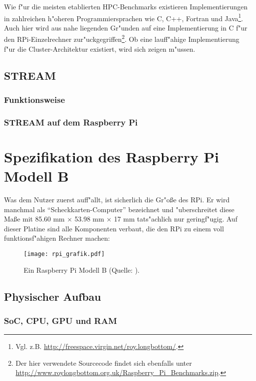 Wie f"ur die meisten etablierten HPC-Benchmarks existieren Implementierungen in zahlreichen h"oheren Programmiersprachen wie C, C++, Fortran und Java\footnote{Vgl. z.B. \url{http://freespace.virgin.net/roy.longbottom/}.}. Auch hier wird aus nahe liegenden Gr"unden auf eine Implementierung in C f"ur den RPi-Einzelrechner zur"uckgegriffen\footnote{Der hier verwendete Sourcecode findet sich ebenfalls unter \url{http://www.roylongbottom.org.uk/Raspberry_Pi_Benchmarks.zip}.}. Ob eine lauff"ahige Implementierung f"ur die Cluster-Architektur existiert, wird sich zeigen m"ussen. 
\subsection{STREAM}\label{STREAM}
\subsubsection{Funktionsweise}\label{Funktionsweise STREAM}
\subsubsection{STREAM auf dem Raspberry Pi}\label{STREAM RPi}
\section{Spezifikation des Raspberry Pi Modell B}\label{RPi Spezifikation}

Was dem Nutzer zuerst auff"allt, ist sicherlich die Gr"o\ss e des RPi. Er wird manchmal als "`Scheckkarten-Computer"' bezeichnet und "uberschreitet diese Ma\ss e mit 85.60 mm $\times$ 53.98 mm $\times$ 17 mm tats"achlich nur geringf"ugig. Auf dieser Platine sind alle Komponenten verbaut, die den RPi zu einem voll funktionsf"ahigen Rechner machen:
\begin{figure}[htb]
	\centering
	\texttt{[image: rpi\_grafik.pdf]}\\ 
	\caption{Ein Raspberry Pi Modell B (Quelle: \cite{scrguide01}).}\label{fig:RPi-Spezifikation}
\end{figure}

\subsection{Physischer Aufbau}\label{RPi Hardware}

\subsubsection{SoC, CPU, GPU und RAM}

